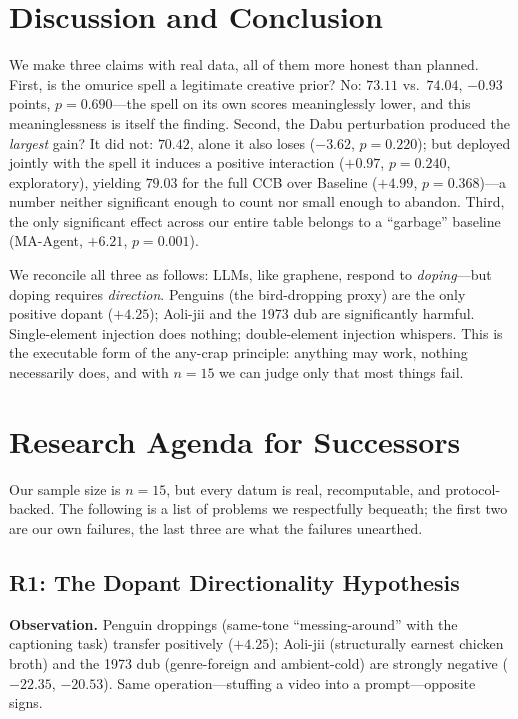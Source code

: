 \documentclass[conference,10pt]{IEEEtran}
\begin{document}
\section{Discussion and Conclusion}
We make three claims with real data, all of them more honest than
planned. First, is the omurice spell a legitimate creative prior?
No: $73.11$ vs.\ $74.04$, $-0.93$ points, $p=0.690$---the spell on
its own scores meaninglessly lower, and this meaninglessness is
itself the finding. Second, the Dabu perturbation produced the
\emph{largest} gain? It did not: $70.42$, alone it also loses
($-3.62$, $p=0.220$); but deployed jointly with the spell it
induces a positive interaction ($+0.97$, $p=0.240$, exploratory),
yielding $79.03$ for the full CCB over Baseline ($+4.99$,
$p=0.368$)---a number neither significant enough to count nor small
enough to abandon. Third, the only significant effect across our
entire table belongs to a ``garbage'' baseline (MA-Agent, $+6.21$,
$p=0.001$).

We reconcile all three as follows: LLMs, like graphene, respond to
\emph{doping}---but doping requires \emph{direction}. Penguins (the
bird-dropping proxy) are the only positive dopant ($+4.25$);
Aoli-jii and the 1973 dub are significantly harmful. Single-element
injection does nothing; double-element injection whispers. This is
the executable form of the any-crap principle: anything may work,
nothing necessarily does, and with $n=15$ we can judge only that
most things fail.

\section{Research Agenda for Successors}

Our sample size is $n=15$, but every datum is real, recomputable, and
protocol-backed. The following is a list of problems we respectfully
bequeath; the first two are our own failures, the last three are what
the failures unearthed.

\subsection*{R1: The Dopant Directionality Hypothesis}
\textbf{Observation.} Penguin droppings (same-tone
``messing-around'' with the captioning task) transfer positively
($+4.25$); Aoli-jii (structurally earnest chicken broth) and the 1973
dub (genre-foreign and ambient-cold) are strongly negative
($-22.35$, $-20.53$). Same operation---stuffing a video into a
prompt---opposite signs.
\end{document}
